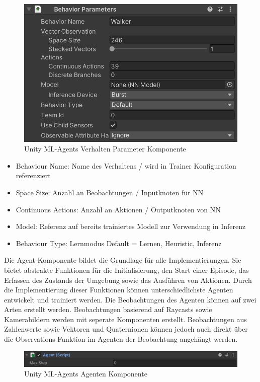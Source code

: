 \begin{figure}[H]
  \centering  
  \includegraphics[scale=0.5]{img/verhalten_komponente.png}
  \caption{Unity ML-Agents Verhalten Parameter Komponente}
  \label{fig:verhalten_komponente}
\end{figure}

\begin{itemize}
  \item Behaviour Name: Name des Verhaltens / wird in Trainer Konfiguration referenziert
  \item Space Size: Anzahl an Beobachtungen / Inputknoten für NN
  \item Continuous Actions: Anzahl an Aktionen / Outputknoten von NN
  \item Model: Referenz auf bereits trainiertes Modell zur Verwendung in Inferenz
  \item Behaviour Type: Lernmodus Default = Lernen, Heuristic, Inferenz
\end{itemize}

Die Agent-Komponente bildet die Grundlage für alle Implementierungen. Sie bietet abstrakte Funktionen für die Initialisierung, den Start einer Episode, das Erfassen des Zustands der Umgebung sowie das Ausführen von Aktionen. Durch die Implementierung dieser Funktionen können unterschiedlichste Agenten entwickelt und trainiert werden. Die Beobachtungen des Agenten können auf zwei Arten erstellt werden. Beobachtungen basierend auf Raycasts sowie Kamerabildern werden mit seperate Komponenten erstellt. Beobachtungen aus Zahlenwerte sowie Vektoren und Quaternionen können jedoch auch direkt über die Observations Funktion im Agenten der Beobachtung angehängt werden.

\begin{figure}[H]
  \centering
  \includegraphics[scale=0.5]{img/agent_komponente}
  \caption{Unity ML-Agents Agenten Komponente}
  \label{fig:agent_komponente}
\end{figure}

